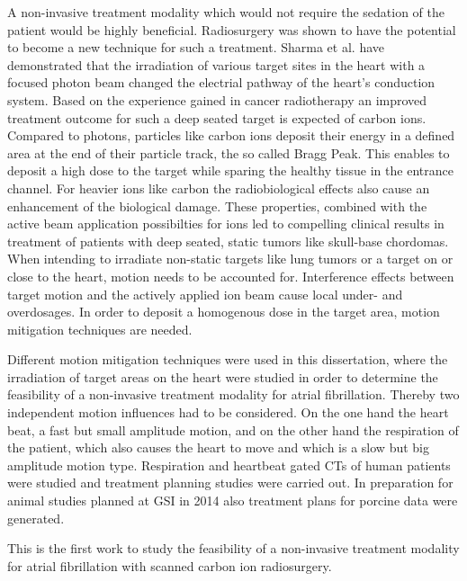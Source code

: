 \documentclass[type=dr, dr=rernat, accentcolor=tud7b,colorbacktitle, bigchapter, openright, twoside, 12pt ]{tudthesis}
\begin{document}
A non-invasive treatment modality which would not require the sedation of the patient would be highly beneficial. Radiosurgery was shown 
to have the potential to become a new technique for such a treatment. Sharma et al. \cite{Sha10} have demonstrated that the irradiation of 
various target sites in the heart with a focused photon beam changed the electrial pathway of the heart's conduction system. 
Based on the experience gained in cancer radiotherapy an improved treatment outcome for such a deep seated target is expected of carbon ions. 
Compared to photons, particles like carbon ions deposit their energy in a defined area at the end of their particle track, the so called Bragg 
Peak. This enables to deposit a high dose to the target while sparing the healthy tissue in the entrance channel. For heavier ions like carbon 
the radiobiological effects also cause an enhancement of the biological damage. These properties, combined with the active beam application 
possibilties for ions led to compelling clinical results in treatment of patients with deep seated, static tumors like skull-base chordomas. 
When intending to irradiate non-static targets like lung tumors or a target on or close to the heart, motion needs to be accounted for. 
Interference effects between target motion and the actively applied ion beam cause local under- and overdosages. In order to deposit a 
homogenous dose in the target area, motion mitigation techniques are needed. \newline

Different motion mitigation techniques were used in this dissertation, where the irradiation of target areas on the heart were studied in 
order to determine the feasibility of a non-invasive treatment modality for atrial fibrillation. Thereby two independent motion influences had 
to be considered. On the one hand the heart beat, a fast but small amplitude motion, and on the other hand the respiration of the patient, 
which also causes the heart to move and which is a slow but big amplitude motion type. Respiration and heartbeat gated CTs of human patients 
were studied and treatment planning studies were carried out. In preparation for animal studies planned at GSI in 2014 also treatment
plans for porcine data were generated. \newline

This is the first work to study the feasibility of a non-invasive treatment modality 
for atrial fibrillation with scanned carbon ion radiosurgery.\newline
\end{document}
